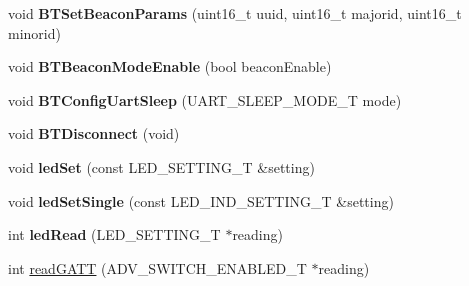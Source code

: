 \begin{DoxyCompactItemize}
\item 
\hypertarget{class_bean_serial_transport_a2f3e4395f4bb0fa6cb797a97fbc475e9}{}void {\bfseries B\+T\+Set\+Beacon\+Params} (uint16\+\_\+t uuid, uint16\+\_\+t majorid, uint16\+\_\+t minorid)\label{class_bean_serial_transport_a2f3e4395f4bb0fa6cb797a97fbc475e9}

\item 
\hypertarget{class_bean_serial_transport_aece16beb31cb0bd4190fd0647e688077}{}void {\bfseries B\+T\+Beacon\+Mode\+Enable} (bool beacon\+Enable)\label{class_bean_serial_transport_aece16beb31cb0bd4190fd0647e688077}

\item 
\hypertarget{class_bean_serial_transport_ae012e35485c3dbeaf7f4053496e8554c}{}void {\bfseries B\+T\+Config\+Uart\+Sleep} (U\+A\+R\+T\+\_\+\+S\+L\+E\+E\+P\+\_\+\+M\+O\+D\+E\+\_\+\+T mode)\label{class_bean_serial_transport_ae012e35485c3dbeaf7f4053496e8554c}

\item 
\hypertarget{class_bean_serial_transport_a58faa381c63f9329758624bb7b55e838}{}void {\bfseries B\+T\+Disconnect} (void)\label{class_bean_serial_transport_a58faa381c63f9329758624bb7b55e838}

\item 
\hypertarget{class_bean_serial_transport_aacb5b7b7b626dbd2f2d49ee569f0fd67}{}void {\bfseries led\+Set} (const L\+E\+D\+\_\+\+S\+E\+T\+T\+I\+N\+G\+\_\+\+T \&setting)\label{class_bean_serial_transport_aacb5b7b7b626dbd2f2d49ee569f0fd67}

\item 
\hypertarget{class_bean_serial_transport_abcf2754019a4309462343be71411628a}{}void {\bfseries led\+Set\+Single} (const L\+E\+D\+\_\+\+I\+N\+D\+\_\+\+S\+E\+T\+T\+I\+N\+G\+\_\+\+T \&setting)\label{class_bean_serial_transport_abcf2754019a4309462343be71411628a}

\item 
\hypertarget{class_bean_serial_transport_a1ecfe2c83c10afefd36ac188375ff893}{}int {\bfseries led\+Read} (L\+E\+D\+\_\+\+S\+E\+T\+T\+I\+N\+G\+\_\+\+T $\ast$reading)\label{class_bean_serial_transport_a1ecfe2c83c10afefd36ac188375ff893}

\item 
\hypertarget{class_bean_serial_transport_a35b2e5e82eee5fa398dde4d919d7a7c4}{}int \hyperlink{class_bean_serial_transport_a35b2e5e82eee5fa398dde4d919d7a7c4}{read\+G\+A\+T\+T} (A\+D\+V\+\_\+\+S\+W\+I\+T\+C\+H\+\_\+\+E\+N\+A\+B\+L\+E\+D\+\_\+\+T $\ast$reading)\label{class_bean_serial_transport_a35b2e5e82eee5fa398dde4d919d7a7c4}


\end{DoxyCompactItemize}
